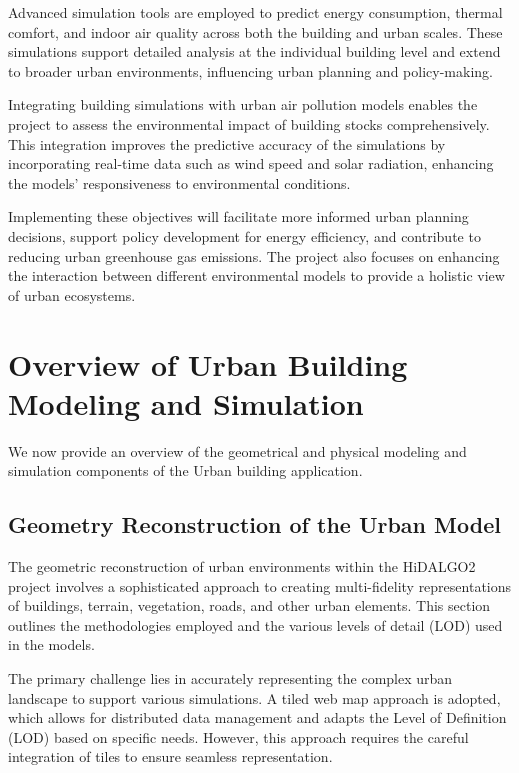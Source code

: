 \documentclass[runningheads]{llncs}
\begin{document}
Advanced simulation tools are employed to predict energy consumption, thermal comfort, and indoor air quality across both the building and urban scales. These simulations support detailed analysis at the individual building level and extend to broader urban environments, influencing urban planning and policy-making.

Integrating building simulations with urban air pollution models enables the project to assess the environmental impact of building stocks comprehensively. This integration improves the predictive accuracy of the simulations by incorporating real-time data such as wind speed and solar radiation, enhancing the models' responsiveness to environmental conditions.

Implementing these objectives will facilitate more informed urban planning decisions, support policy development for energy efficiency, and contribute to reducing urban greenhouse gas emissions. The project also focuses on enhancing the interaction between different environmental models to provide a holistic view of urban ecosystems.

\section{Overview of Urban Building Modeling and Simulation}

We now provide an overview of the geometrical and physical modeling and simulation components of the Urban building application.

\subsection{Geometry Reconstruction of the Urban Model}

The geometric reconstruction of urban environments within the HiDALGO2 project involves a sophisticated approach to creating multi-fidelity representations of buildings, terrain, vegetation, roads, and other urban elements. This section outlines the methodologies employed and the various levels of detail (LOD) used in the models.

The primary challenge lies in accurately representing the complex urban landscape to support various simulations. A tiled web map approach is adopted, which allows for distributed data management and adapts the Level of Definition (LOD) based on specific needs. However, this approach requires the careful integration of tiles to ensure seamless representation.
\end{document}

